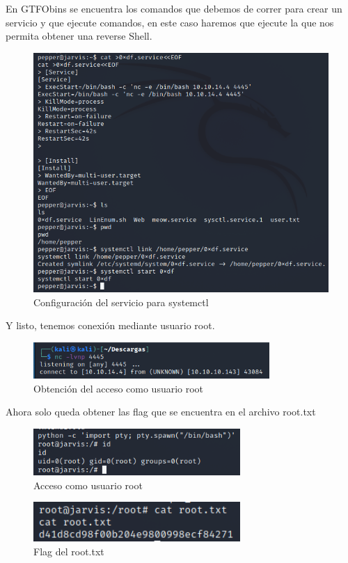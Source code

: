 \documentclass{article}
\begin{document}
En GTFObins se encuentra los comandos que debemos de correr para crear un servicio y que ejecute comandos, en este caso haremos que ejecute la que nos permita obtener una reverse Shell.
\begin{figure}[H]
	\center
	\includegraphics[width=\textwidth]{images/jarvis/20.png}
	\caption{Configuración del servicio para systemctl}
\end{figure}

Y listo, tenemos conexión mediante usuario root.
\begin{figure}[H]
	\center
	\includegraphics[width=0.8\textwidth]{images/jarvis/21.png}
	\caption{Obtención del acceso como usuario root}
\end{figure}

Ahora solo queda obtener las flag que se encuentra en el archivo root.txt
\begin{figure}[H]
	\center
	\includegraphics[width=0.7\textwidth]{images/jarvis/22.png}
	\caption{Acceso como usuario root}
\end{figure}\begin{figure}[H]
	\center
	\includegraphics[width=0.7\textwidth]{images/jarvis/23.png}
	\caption{Flag del root.txt}
\end{figure}
\end{document}
